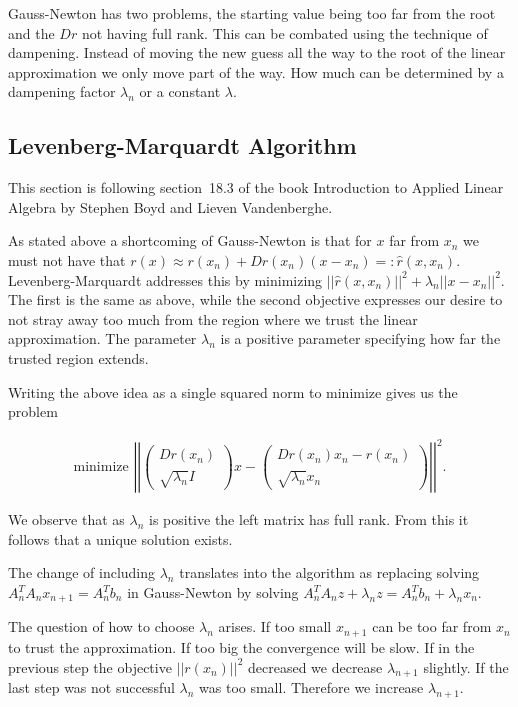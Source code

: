 Gauss-Newton has two problems, the starting value being too far from the root and the $Dr$ not having full rank. This can be combated using the technique of dampening. Instead of moving the new guess all the way to the root of the linear approximation we only move part of the way. How much can be determined by a dampening factor $\lambda_n$ or a constant $\lambda$.

\subsection{Levenberg-Marquardt Algorithm}

This section is following section~18.3 of the book Introduction to Applied Linear Algebra by Stephen Boyd and Lieven Vandenberghe\cite{Boyd2018}.

As stated above a shortcoming of Gauss-Newton is that for $x$ far from $x_n$ we must not have that $r(x) \approx r(x_n) + Dr(x_n)(x-x_n) =: \hat{r}(x, x_n)$. Levenberg-Marquardt addresses this by minimizing $||\hat{r}(x, x_n)||^2 + \lambda_n ||x-x_n||^2$. The first is the same as above, while the second objective expresses our desire to not stray away too much from the region where we trust the linear approximation. The parameter $\lambda_n$ is a positive parameter specifying how far the trusted region extends.

Writing the above idea as a single squared norm to minimize gives us the problem

\begin{align*}
	\text{minimize }
	\left|\left|\left(\begin{matrix}
		Dr(x_n)\\ \sqrt{\lambda_n}I
	\end{matrix}\right) x - \left(\begin{matrix}
		Dr(x_n)x_n - r(x_n)\\ \sqrt{\lambda_n} x_n
	\end{matrix}\right)\right|\right|^2.
\end{align*}

We observe that as $\lambda_n$ is positive the left matrix has full rank. From this it follows that a unique solution exists.

The change of including $\lambda_n$ translates into the algorithm as replacing solving $A_n^TA_nx_{n+1} = A_n^Tb_n$ in Gauss-Newton by solving $A_n^T A_n z + \lambda_n z= A_n^T b_n + \lambda_n x_n$.

The question of how to choose $\lambda_n$ arises. If too small $x_{n+1}$ can be too far from $x_n$ to trust the approximation. If too big the convergence will be slow. If in the previous step the objective $||r(x_n)||^2$ decreased we decrease $\lambda_{n+1}$ slightly. If the last step was not successful $\lambda_n$ was too small. Therefore we increase $\lambda_{n+1}$.

